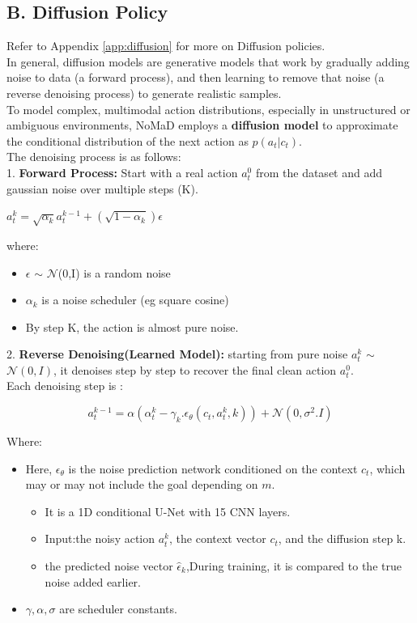 \documentclass[12pt]{article}
\begin{document}
\subsection*{B. Diffusion Policy}
Refer to Appendix \ref{app:diffusion} for more on Diffusion policies.\\
In general, diffusion models are generative models that work by gradually adding noise to data (a forward process), and then learning to remove that noise (a reverse denoising process) to generate realistic samples.\\
To model complex, multimodal action distributions, especially in unstructured or ambiguous environments, NoMaD employs a \textbf{diffusion model} to approximate the conditional distribution of the next action as $p(a_t | c_t)$. \\
The denoising process is as follows:\\
1. \textbf{Forward Process:} Start with a real action $a^{0}_t$ from the dataset and add gaussian noise over multiple steps (K). 
\begin{center}
    $a^{k}_t = \sqrt{\alpha_k} a^{k-1}_t + (\sqrt{1 - \alpha_k}) \epsilon$
\end{center}
where:\\
\begin{itemize}
    \item $\epsilon$ $\sim$ $\mathcal{N}$(0,I) is a random noise
    \item $\alpha_k$ is a noise scheduler (eg square cosine)
    \item By step K, the action is almost pure noise.
\end{itemize}
2. \textbf{Reverse Denoising(Learned Model):} starting from pure noise $a^{k}_t$ $\sim$ $\mathcal{N}(0,I)$, it denoises step by step to recover the final clean action $a^{0}_t$.\\
Each denoising step is :
\begin{center}
    \[a^{k-1}_t = \alpha(\alpha^{k}_t-\gamma_k.\epsilon_{\theta}(c_t, a^{k}_t,k)) + \mathcal{N}(0,\sigma^2.I)\]
\end{center}
Where:
\begin{itemize}
    \item Here, $\epsilon_\theta$ is the noise prediction network conditioned on the context $c_t$, which may or may not include the goal depending on $m$.
    \begin{itemize}
        \item It is a 1D conditional U-Net with 15 CNN layers.
        \item Input:the noisy action $a^{k}_t$, the context vector $c_t$, and the diffusion step k.
        \item the predicted noise vector $\hat{\epsilon}_k$,During training, it is compared to the true noise added earlier.
    \end{itemize}
    \item $\gamma, \alpha ,\sigma$ are scheduler constants.
\end{itemize}
\end{document}
